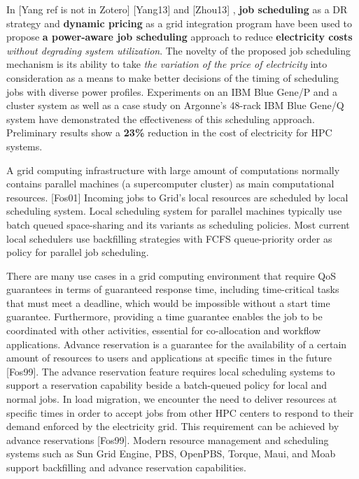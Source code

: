 In [Yang ref is not in Zotero] 
\cite{zhou_reducing_2013}
[Yang13] and [Zhou13] , \textbf{job scheduling} as a DR strategy and
\textbf{dynamic pricing} as a grid integration program have been used to
propose \textbf{a power-aware job scheduling} approach to reduce
\textbf{electricity costs} \textit{without degrading system utilization}. 
The novelty of the proposed job scheduling
mechanism is its ability to take \textit{the variation of 
the price of electricity }into consideration as a means to make
better decisions of the timing of scheduling jobs with diverse power
profiles. Experiments on an IBM Blue Gene/P and a cluster system as
well as a case study on Argonne's 48-rack IBM Blue Gene/Q system have
demonstrated the effectiveness of this scheduling approach. Preliminary
results show a \textbf{23{\%}} reduction in the cost of electricity for HPC systems.


A grid computing infrastructure with large amount of computations normally
contains parallel machines (a supercomputer cluster) as main computational
resources.  \cite{foster_anatomy_2001} [Fos01]
Incoming jobs to Grid's local resources are scheduled by
local scheduling system. Local scheduling system for parallel machines
typically use batch queued space-sharing and its variants as scheduling
policies. Most current local schedulers use backfilling strategies with FCFS
queue-priority order as policy for parallel job scheduling.

There are many use cases in a grid computing environment that require QoS
guarantees in terms of guaranteed response time, including time-critical
tasks that must meet a deadline, which would be impossible without a start
time guarantee. Furthermore, providing a time guarantee enables the job to be
coordinated with other activities, essential for co-allocation and workflow
applications. Advance reservation is a guarantee for the availability of a
certain amount of resources to users and applications at specific times in
the future 
\cite{foster_distributed_1999} [Fos99]. The advance reservation feature requires local scheduling
systems to support a reservation capability beside a batch-queued policy for
local and normal jobs. In load migration, we encounter the need to deliver
resources at specific times in order to accept jobs from other HPC centers
to respond to their demand enforced by the electricity grid. This requirement
can be achieved by advance reservations 
\cite{foster_distributed_1999}
[Fos99]. Modern resource management
and scheduling systems such as Sun Grid Engine, PBS, OpenPBS, Torque, Maui,
and Moab support backfilling and advance reservation capabilities.

